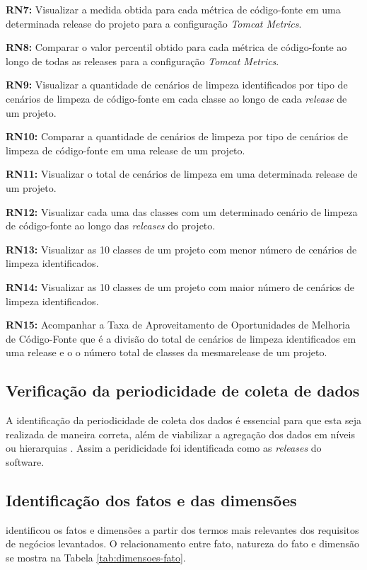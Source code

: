 \textbf{RN7:}  Visualizar a medida obtida para cada métrica de código-fonte em uma determinada release do projeto para a configuração \textit{Tomcat Metrics}.

\textbf{RN8:}  Comparar o valor percentil obtido para cada métrica de código-fonte ao longo de todas as releases para a configuração \textit{Tomcat Metrics}.

\textbf{RN9:}  Visualizar a quantidade de cenários de limpeza identificados por tipo de cenários de limpeza de código-fonte em cada classe ao longo de cada \textit{release} de um projeto.

\textbf{RN10:}  Comparar a quantidade de cenários de limpeza por tipo de cenários de limpeza de código-fonte em uma release de um projeto.

\textbf{RN11:}  Visualizar o total de cenários de limpeza em uma determinada release de um projeto.

\textbf{RN12:}  Visualizar cada uma das classes com um determinado cenário de limpeza de código-fonte ao longo das \textit{releases} do projeto.

\textbf{RN13:}  Visualizar as 10 classes de um projeto com menor número de cenários de limpeza identificados.

\textbf{RN14:}  Visualizar as 10 classes de um projeto com maior número de cenários de limpeza identificados.

\textbf{RN15:}  Acompanhar a Taxa de Aproveitamento de Oportunidades de Melhoria de Código-Fonte que é a divisão do  total de cenários de limpeza identificados em uma release e o o número total de classes da mesmarelease de um projeto.


\subsection{Verificação da periodicidade de coleta de dados}

A identificação da periodicidade de coleta dos dados é essencial para que esta seja
realizada de maneira correta, além de viabilizar a agregação dos dados em níveis ou
hierarquias \cite{rego_monitoramento_2014}. Assim a peridicidade foi identificada como as \textit{releases} do software.

\subsection{Identificação dos fatos e das dimensões}

 identificou os fatos e dimensões a partir dos termos mais relevantes dos requisitos de negócios levantados. O relacionamento entre fato, natureza do fato e dimensão se mostra na Tabela \ref{tab:dimensoes-fato}.


